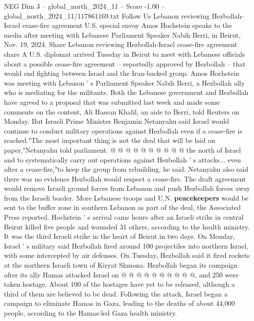 \begin{textsample}{NEG Dim 3 – global\_north\_2024\_11 – Score -1.00 – global\_north\_2024\_11/117861169.txt}  \label{ex:f3_neg_285}
Follow Us Lebanon reviewing Hezbollah-Israel cease-fire agreement U.S. special envoy Amos Hochstein speaks to the media after meeting with Lebanese Parliament Speaker Nabih Berri, in Beirut, Nov. 19, 2024.
Share Lebanon reviewing Hezbollah-Israel cease-fire agreement share A U.S. diplomat arrived Tuesday in Beirut to meet with Lebanese officials about a possible cease-fire agreement -- reportedly approved by Hezbollah -- that would end fighting between Israel and the Iran-backed group.
Amos Hochstein was meeting with Lebanon ' s Parliament Speaker Nabih Berri, a Hezbollah ally who is mediating for the militants.
Both the Lebanese government and Hezbollah have agreed to a proposal that was submitted last week and made some comments on the content, Ali Hassan Khalil, an aide to Berri, told Reuters on Monday.
But Israeli Prime Minister Benjamin Netanyahu said Israel would continue to conduct military operations against Hezbollah even if a cease-fire is reached."The most important thing is not the deal that will be laid on paper,"Netanyahu told parliament. @ @ @ @ @ @ @ @ @ @ the north of Israel and to systematically carry out operations against Hezbollah ' s attacks... even after a cease-fire,"to keep the group from rebuilding, he said.
Netanyahu also said there was no evidence Hezbollah would respect a cease-fire.
The draft agreement would remove Israeli ground forces from Lebanon and push Hezbollah forces away from the Israeli border.
More Lebanese troops and U.N. \textbf{peacekeepers} would be sent to the buffer zone in southern Lebanon as part of the deal, the Associated Press reported.
Hochstein ' s arrival came hours after an Israeli strike in central Beirut killed five people and wounded 31 others, according to the health ministry.
It was the third Israeli strike in the heart of Beirut in two days.
On Monday, Israel ' s military said Hezbollah fired around 100 projectiles into northern Israel, with some intercepted by air defenses.
On Tuesday, Hezbollah said it fired rockets at the northern Israeli town of Kiryat Shmona.
Hezbollah began its campaign after its ally Hamas attacked Israel on @ @ @ @ @ @ @ @ @ @, and 250 were taken hostage.
About 100 of the hostages have yet to be released, although a third of them are believed to be dead.
Following the attack, Israel began a campaign to eliminate Hamas in Gaza, leading to the deaths of about 44,000 people, according to the Hamas-led Gaza health ministry.

\end{textsample}

